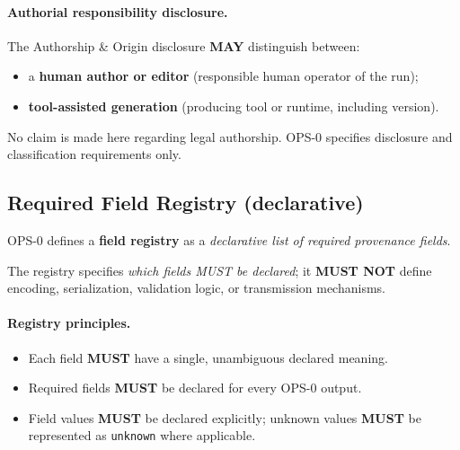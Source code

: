 \paragraph{Authorial responsibility disclosure.}
The Authorship \& Origin disclosure \textbf{MAY}
distinguish between:

\begin{itemize}
  \item a \textbf{human author or editor}
        (responsible human operator of the run);
  \item \textbf{tool-assisted generation}
        (producing tool or runtime, including version).
\end{itemize}

No claim is made here regarding legal authorship.
OPS-0 specifies disclosure and classification
requirements only.

\subsection{Required Field Registry (declarative)}
\label{sec:ops0_required_field_registry}
OPS-0 defines a \textbf{field registry}
as a \emph{declarative list of required provenance fields}.

The registry specifies \emph{which fields MUST be declared};
it \textbf{MUST NOT} define encoding,
serialization, validation logic,
or transmission mechanisms.

\paragraph{Registry principles.}
\begin{itemize}
  \item Each field \textbf{MUST} have a single,
        unambiguous declared meaning.
  \item Required fields \textbf{MUST} be declared
        for every OPS-0 output.
  \item Field values \textbf{MUST} be declared explicitly;
        unknown values \textbf{MUST} be represented
        as \texttt{unknown} where applicable.
\end{itemize}

